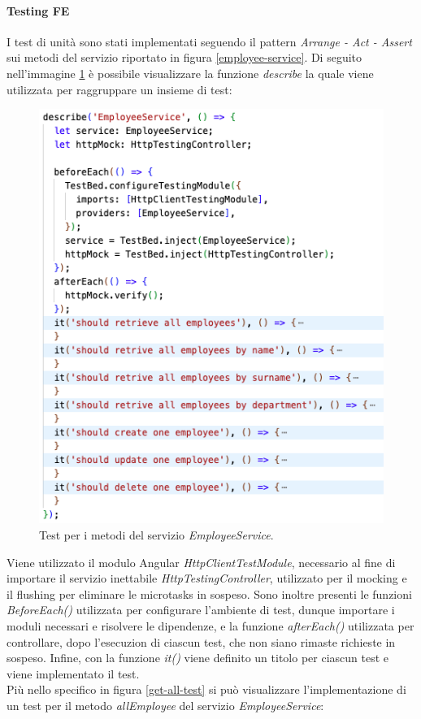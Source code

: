 \paragraph{Testing FE}
I test di unità sono stati implementati seguendo il pattern \textit{Arrange - Act - Assert} sui metodi del servizio riportato in figura \ref{employee-service}. Di seguito nell'immagine \ref{employee-service-tests} è possibile visualizzare la funzione \textit{describe} la quale viene utilizzata per raggruppare un insieme di test:
\FloatBarrier
\begin{figure}[!ht]
\centering
\includegraphics[width=0.6\linewidth]{immagini/employeeServiceTest.png}
\caption{Test per i metodi del servizio \textit{EmployeeService}.}
\label{employee-service-tests}
\end{figure}
\FloatBarrier
Viene utilizzato il modulo Angular \textit{HttpClientTestModule}, necessario al fine di importare il servizio inettabile \textit{HttpTestingController}, utilizzato per il mocking e il flushing per eliminare le microtasks in sospeso. Sono inoltre presenti le funzioni \textit{BeforeEach()} utilizzata per configurare l'ambiente di test, dunque importare i moduli necessari e risolvere le dipendenze, e la funzione \textit{afterEach()} utilizzata per controllare, dopo l'esecuzion di ciascun test, che non siano rimaste richieste in sospeso. Infine, con la funzione \textit{it()} viene definito un titolo per ciascun test e viene implementato il test.\\
Più nello specifico in figura \ref{get-all-test} si può visualizzare l'implementazione di un test per il metodo \textit{allEmployee} del servizio \textit{EmployeeService}:
\FloatBarrier
